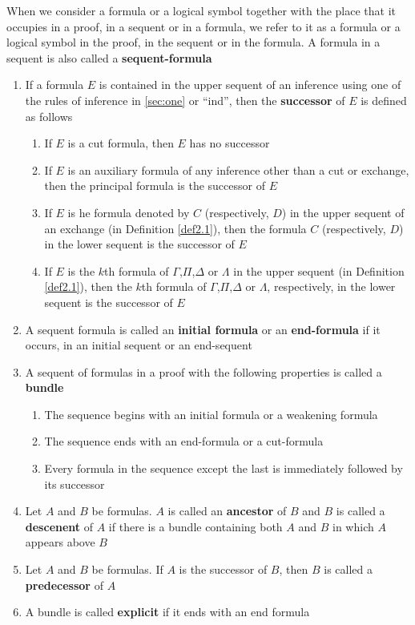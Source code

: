 \documentclass[11pt]{article}
\begin{document}
\begin{definition}[]
\label{def9.7}
When we consider a formula or a logical symbol together with the place that it occupies in a
proof, in a sequent or in a formula, we refer to it as a formula or a logical symbol in the
proof, in the sequent or in the formula. A formula in a sequent is also called a
\textbf{sequent-formula}
\begin{enumerate}
\item If a formula \(E\) is contained in the upper sequent of an inference using one of the rules of
inference in \ref{sec:one} or ``ind'', then the \textbf{successor} of \(E\) is defined as follows
\begin{enumerate}
\item If \(E\) is a cut formula, then \(E\) has no successor
\item If \(E\) is an auxiliary formula of any inference other than a cut or exchange, then the
principal formula is the successor of \(E\)
\item If \(E\) is he formula denoted by \(C\) (respectively, \(D\)) in the upper sequent of an
exchange (in Definition \ref{def2.1}), then the formula \(C\) (respectively, \(D\)) in the
lower sequent is the successor of \(E\)
\item If \(E\) is the \(k\)th formula of \(\Gamma\),\(\Pi\),\(\Delta\) or \(\Lambda\) in the upper sequent (in Definition
\ref{def2.1}), then the \(k\)th formula of \(\Gamma\),\(\Pi\),\(\Delta\) or \(\Lambda\), respectively, in the lower sequent is
the successor of \(E\)
\end{enumerate}
\item A sequent formula is called an \textbf{initial formula} or an \textbf{end-formula} if it occurs, in an initial
sequent or an end-sequent
\item A sequent of formulas in a proof with the following properties is called a \textbf{bundle}
\begin{enumerate}
\item The sequence begins with an initial formula or a weakening formula
\item The sequence ends with an end-formula or a cut-formula
\item Every formula in the sequence except the last is immediately followed by its successor
\end{enumerate}
\item Let \(A\) and \(B\) be formulas. \(A\) is called an \textbf{ancestor} of \(B\) and \(B\) is called a
\textbf{descenent} of \(A\) if there is a bundle containing both \(A\) and \(B\) in which \(A\)
appears above \(B\)
\item Let \(A\) and \(B\)  be formulas. If \(A\) is the successor of \(B\), then \(B\) is called a
\textbf{predecessor} of \(A\)
\item A bundle is called \textbf{explicit} if it ends with an end formula


\end{enumerate}
\end{definition}
\end{document}
